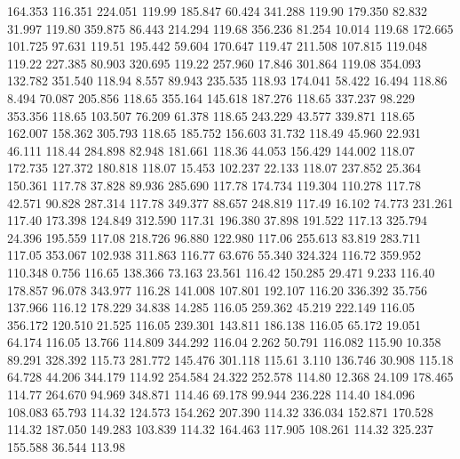  164.353  116.351  224.051       119.99
 185.847   60.424  341.288       119.90
 179.350   82.832   31.997       119.80
 359.875   86.443  214.294       119.68
 356.236   81.254   10.014       119.68
 172.665  101.725   97.631       119.51
 195.442   59.604  170.647       119.47
 211.508  107.815  119.048       119.22
 227.385   80.903  320.695       119.22
 257.960   17.846  301.864       119.08
 354.093  132.782  351.540       118.94
   8.557   89.943  235.535       118.93
 174.041   58.422   16.494       118.86
   8.494   70.087  205.856       118.65
 355.164  145.618  187.276       118.65
 337.237   98.229  353.356       118.65
 103.507   76.209   61.378       118.65
 243.229   43.577  339.871       118.65
 162.007  158.362  305.793       118.65
 185.752  156.603   31.732       118.49
  45.960   22.931   46.111       118.44
 284.898   82.948  181.661       118.36
  44.053  156.429  144.002       118.07
 172.735  127.372  180.818       118.07
  15.453  102.237   22.133       118.07
 237.852   25.364  150.361       117.78
  37.828   89.936  285.690       117.78
 174.734  119.304  110.278       117.78
  42.571   90.828  287.314       117.78
 349.377   88.657  248.819       117.49
  16.102   74.773  231.261       117.40
 173.398  124.849  312.590       117.31
 196.380   37.898  191.522       117.13
 325.794   24.396  195.559       117.08
 218.726   96.880  122.980       117.06
 255.613   83.819  283.711       117.05
 353.067  102.938  311.863       116.77
  63.676   55.340  324.324       116.72
 359.952  110.348    0.756       116.65
 138.366   73.163   23.561       116.42
 150.285   29.471    9.233       116.40
 178.857   96.078  343.977       116.28
 141.008  107.801  192.107       116.20
 336.392   35.756  137.966       116.12
 178.229   34.838   14.285       116.05
 259.362   45.219  222.149       116.05
 356.172  120.510   21.525       116.05
 239.301  143.811  186.138       116.05
  65.172   19.051   64.174       116.05
  13.766  114.809  344.292       116.04
   2.262   50.791  116.082       115.90
  10.358   89.291  328.392       115.73
 281.772  145.476  301.118       115.61
   3.110  136.746   30.908       115.18
  64.728   44.206  344.179       114.92
 254.584   24.322  252.578       114.80
  12.368   24.109  178.465       114.77
 264.670   94.969  348.871       114.46
  69.178   99.944  236.228       114.40
 184.096  108.083   65.793       114.32
 124.573  154.262  207.390       114.32
 336.034  152.871  170.528       114.32
 187.050  149.283  103.839       114.32
 164.463  117.905  108.261       114.32
 325.237  155.588   36.544       113.98
